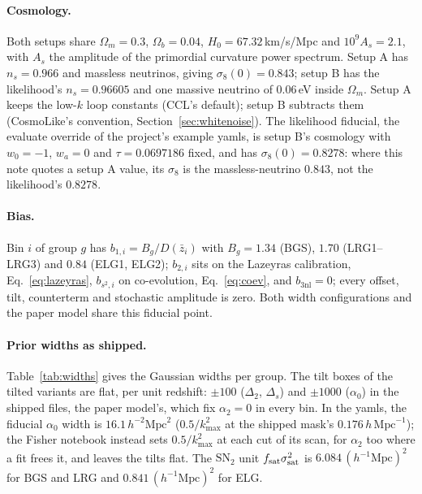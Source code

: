 \documentclass[11pt]{article}
\newcommand{\bthree}{b_{3\mathrm{nl}}} %
\newcommand{\kmax}{k_{\mathrm{max}}}
\newcommand{\hMpc}{\,h\,\mathrm{Mpc}^{-1}}
\newcommand{\aunit}{\,h^{-2}\mathrm{Mpc}^2}
\newcommand{\SNt}{\mathrm{SN}_2}
\begin{document}
\paragraph{Cosmology.}
Both setups share $\Omega_m = 0.3$, $\Omega_b = 0.04$,
$H_0 = 67.32$\,km/s/Mpc and $10^9 A_s = 2.1$, with $A_s$ the amplitude
of the primordial curvature power spectrum.  Setup A has $n_s = 0.966$
and massless neutrinos, giving $\sigma_8(0) = 0.843$; setup B has the
likelihood's $n_s = 0.96605$ and one massive neutrino of $0.06$\,eV
inside $\Omega_m$.  Setup A keeps the low-$k$ loop constants (CCL's
default); setup B subtracts them (CosmoLike's convention,
Section~\ref{sec:whitenoise}).  The likelihood fiducial, the evaluate
override of the project's example yamls, is setup B's cosmology with
$w_0 = -1$, $w_a = 0$ and $\tau = 0.0697186$ fixed, and has
$\sigma_8(0) = 0.8278$: where this note quotes a setup A value, its
$\sigma_8$ is the massless-neutrino $0.843$, not the likelihood's
$0.8278$.

\paragraph{Bias.}
Bin $i$ of group $g$ has $b_{1,i} = B_g/D(\bar{z}_i)$ with
$B_g = 1.34$ (BGS), $1.70$ (LRG1--LRG3) and $0.84$ (ELG1, ELG2);
$b_{2,i}$ sits on the Lazeyras calibration, Eq.~\eqref{eq:lazeyras},
$b_{s^2,i}$ on co-evolution, Eq.~\eqref{eq:coev}, and $\bthree = 0$;
every offset, tilt, counterterm and stochastic amplitude is zero.
Both width configurations and the paper model share this fiducial
point.

\paragraph{Prior widths as shipped.}
Table~\ref{tab:widths} gives the Gaussian widths per group.  The tilt
boxes of the tilted variants are flat, per unit redshift: $\pm100$
($\Delta_2$, $\Delta_s$) and $\pm1000$ ($\alpha_0$) in the shipped
files, the paper model's, which fix $\alpha_2 = 0$ in every bin.  In
the yamls, the fiducial
$\alpha_0$ width is $16.1\aunit$ ($0.5/\kmax^2$ at the
shipped mask's $0.176\hMpc$); the Fisher notebook instead sets
$0.5/\kmax^2$ at each cut of its scan, for $\alpha_2$ too where a
fit frees it, and leaves the tilts flat.  The
$\SNt$ unit $f_{\rm sat}\sigma_{\rm sat}^2$ is
$6.084\,(h^{-1}\mathrm{Mpc})^2$ for BGS and LRG and
$0.841\,(h^{-1}\mathrm{Mpc})^2$ for ELG.
\end{document}
